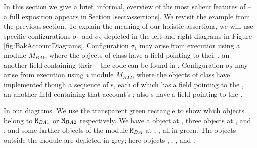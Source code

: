 
In this section we give a brief, informal, overview of the most salient features of  \Chainmail --
a full exposition appears in Section \ref{sect:assertions}.
We revisit the  example from the previous section. 
To explain the meaning of our holistic assertions, we will use specific configurations $\sigma_1$ and $\sigma_2$
depicted in the left and right diagrams in Figure \ref{fig:BakAccountDiagrams}.
Configuration  $\sigma_1$ may arise from execution using a module $M_{BA1}$, where the objects of
class  have a field pointing to their , an another field containing their 
-- the code can be found in \TODO. 
Configuration  $\sigma_2$ may arise from execution using a module $M_{BA2}$, where the objects of
class  have  implemented though a sequence of s, each of which has a 
 field pointing to the , an another field containing that account's ; also
 s have a field pointing to the .

In our diagrams. 
We use the transparent green rectangle to show which objects belong to  ${\mbox{\tt{\ensuremath{{\mbox{\tt{M}}}}}}}_{BA1}$ or  ${\mbox{\tt{\ensuremath{{\mbox{\tt{M}}}}}}}_{BA2}$ respectively.
We have a   object at ,
 three  objects at ,  and , and some further  objects of the 
   module ${\mbox{\tt{\ensuremath{{\mbox{\tt{M}}}}}}}_{BA}$  %
at ,  \etc, all in green. 
The objects
outside the module are depicted in grey; here objects , , , and .

